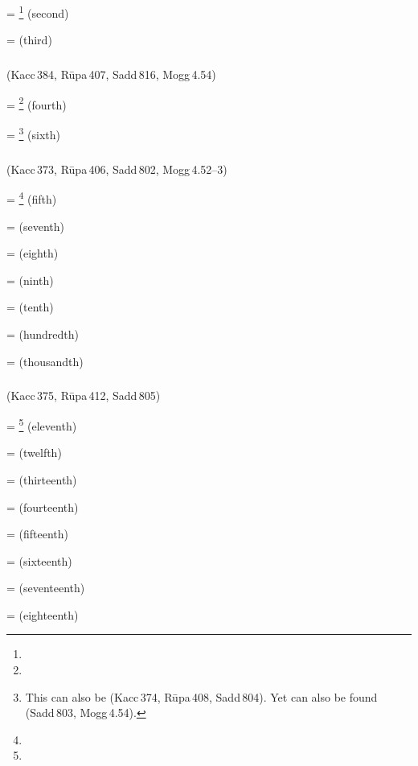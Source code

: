  = \footnote{} (second) \par
{} =  (third) \par

\subparagraph*{} (Kacc\,384, R\=upa\,407, Sadd\,816, Mogg\,4.54)\label{pacct12:tha}\label{pacct12:dtha}\label{pacct12:ttha}\label{pacct12:dtdtha}\label{pacct12:dtdthama}

 = \footnote{} (fourth) \par
{} = \footnote{This can also be  (Kacc\,374, R\=upa\,408, Sadd\,804). Yet  can also be found (Sadd\,803, Mogg\,4.54).} (sixth) \par

\subparagraph*{} (Kacc\,373, R\=upa\,406, Sadd\,802, Mogg\,4.52--3)\label{pacct12:ma}

 = \footnote{} (fifth) \par
{} =  (seventh) \par
{} =  (eighth) \par
{} =  (ninth) \par
{} =  (tenth) \par
{} =  (hundredth) \par
{} =  (thousandth) \par

\subparagraph*{} (Kacc\,375, R\=upa\,412, Sadd\,805)\label{pacct12:ii}

 = \footnote{} (eleventh) \par
{} =  (twelfth) \par
{} =  (thirteenth) \par
{} =  (fourteenth) \par
{} =  (fifteenth) \par
{} =  (sixteenth) \par
{} =  (seventeenth) \par
{} =  (eighteenth) \par

